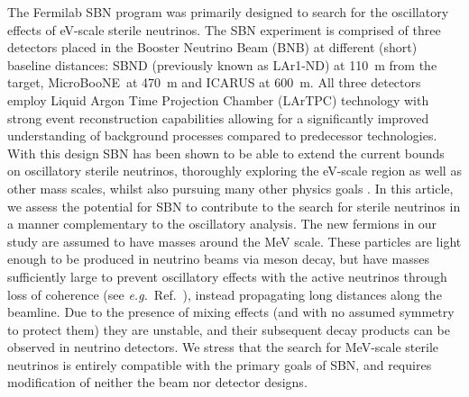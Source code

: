 \documentclass[11pt, a4paper]{article}
\newcommand{\refref}[1]{Ref.~\cite{#1}}
\def\eg{\emph{e.g.}}
\def\muboone{MicroBooNE}
\begin{document}
The Fermilab SBN \cite{Antonello:2015lea} program was primarily designed to
search for the oscillatory effects of eV-scale sterile neutrinos.
%
The SBN experiment is comprised of three detectors placed in the Booster
Neutrino Beam (BNB) at different (short) baseline distances: SBND (previously
known as LAr1-ND) at 110~m from the target, \muboone\ at 470~m and ICARUS at
600~m.  All three detectors employ Liquid Argon Time Projection Chamber
(LArTPC) technology \cite{Rubbia:1977} with strong event reconstruction
capabilities allowing for a significantly improved understanding of background
processes compared to predecessor technologies. 
%
With this design SBN has been shown to be able to extend the current bounds on
oscillatory sterile neutrinos, thoroughly exploring the eV-scale region as well
as other mass scales, whilst also pursuing many other physics goals
\cite{Antonello:2015lea}.
%
In this article, we assess the potential for SBN to contribute to the search
for sterile neutrinos in a manner complementary to the oscillatory analysis.
The new fermions in our study are assumed to have masses around the MeV scale.
These particles are light enough to be produced in neutrino beams via meson
decay, but have masses sufficiently large to prevent oscillatory effects with
the active neutrinos through loss of coherence (see \eg\
\refref{Akhmedov:2009rb}), instead propagating long distances along the
beamline. Due to the presence of mixing effects (and with no assumed symmetry
to protect them) they are unstable, and their
subsequent decay products can be observed in neutrino detectors.
%
%
%
We stress that the search for MeV-scale sterile neutrinos is entirely
compatible with the primary goals of SBN, and requires modification of
neither the beam nor detector designs. 

\end{document}
